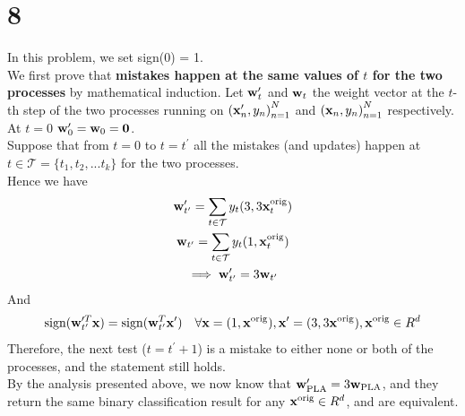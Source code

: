 \documentclass[11pt]{article}
\let\mathbb\relax
\theoremstyle{definition}
\begin{document}
\section*{8}
In this problem, we set sign(0) = 1. \\ 
We first prove that \textbf{mistakes happen at the same values of $t$ for the two processes} by mathematical induction. Let $\vb{w}_t^\prime$ and $\vb{w}_t$ the weight vector at the $t$-th step of the two processes running on ${(\vb{x}^\prime_n, y_n)}^N_{n=1}$ and ${(\vb{x}_n, y_n)}^N_{n=1}$ respectively. \\
At $t = 0$ $\vb{w}^\prime_0 = \vb{w}_0 = \vb{0}$. \\ 
Suppose that from $t=0$ to $t=t^\prime$ all the mistakes (and updates) happen at $t\in\mathcal{T} = \{t_1, t_2,... t_k\}$ for the two processes. \\ 
Hence we have
\begin{gather*}
  \vb{w}^\prime_{t^\prime} = \sum_{t\in\mathcal{T}}y_t(3, 3\vb{x}_t^\text{orig}) \\ 
  \vb{w}_{t^\prime} = \sum_{t\in\mathcal{T}}y_t(1, \vb{x}_t^\text{orig}) \\ 
  \implies \vb{w}^\prime_{t^\prime} = 3\vb{w}_{t^\prime}
\end{gather*}
And
\[
  \text{sign}(\vb{w}^{\prime T}_{t^\prime}\vb{x}) = \text{sign}(\vb{w}_{t^\prime}^T\vb{x}^\prime) \quad \forall \vb{x} = (1, \vb{x}^\text{orig}), \vb{x}^\prime = (3, 3\vb{x}^\text{orig}), \vb{x}^\text{orig}\in\mathbb{R}^d
\]
Therefore, the next test ($t = t^\prime + 1$) is a mistake to either none or both of the processes, and the statement still holds. \\ 
By the analysis presented above, we now know that $\vb{w}_\text{PLA}^\prime = 3\vb{w}_\text{PLA}$, and they return the same binary classification result for any $\vb{x}^\text{orig} \in \mathbb{R}^d$, and are equivalent.
\newpage
\end{document}
